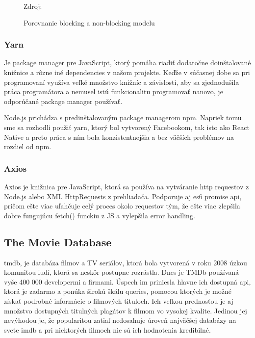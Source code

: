 \begin{figure}[!htbp]
  \centering  
  \def\stackalignment{c}
           {\scriptsize%
            Zdroj: \cite{nodejs}}
	\caption{Porovnanie blocking a non-blocking modelu}  
  \label{nodejsImg}
\end{figure}

\subsubsection{Yarn}
Je package manager pre JavaScript, ktorý pomáha riadiť dodatočne doinštalované knižnice a rôzne iné dependencies v našom projekte. Keďže v súčasnej dobe sa pri programovaní využíva veľké množstvo knižníc a závislosti, aby sa zjednodušila práca programátora a nemusel istú funkcionalitu programovať nanovo, je odporúčané package manager používať.

Node.js prichádza s predinštalovaným package managerom npm. Napriek tomu sme sa rozhodli použiť yarn, ktorý bol vytvorený Facebookom, tak isto ako React Native a preto práca s ním bola konzistentnejšia a bez väčších problémov na rozdiel od npm. \\

\subsubsection{Axios}
Axios je knižnica pre JavaScript, ktorá sa používa na vytváranie \acrshort{http} requestov z Node.js alebo XML HttpRequests z prehliadača. Podporuje aj \acrshort{es6} promise \acrshort{api}, pričom ešte viac uľahčuje celý proces okolo requestov tým, že ešte viac zlepšila dobre fungujúcu fetch() funckiu z JS a vylepšila error handling. \cite{axios} \\

\subsection{The Movie Database}
 \acrfull{tmdb}, je databáza filmov a TV seriálov, ktorá bola vytvorená v roku 2008 úzkou komunitou ľudí, ktorá sa neskôr postupne rozrástla. Dnes je TMDb používaná vyše 400 000 developermi a firmami. \cite{tmdb} Úspech im priniesla hlavne ich dostupná \acrshort{api}, ktorá je zadarmo a ponúka širokú škálu queries, pomocou ktorých je možné získať podrobné informácie o filmových tituloch. Ich veľkou prednosťou je aj množstvo dostupných titulných plagátov k filmom vo vysokej kvalite. Jedinou jej nevýhodou je, že popularitou zatiaľ nedosahuje úroveň najväčšej databázy na svete \acrshort{imdb} a pri niektorých filmoch nie sú ich hodnotenia kredibilné. \\

